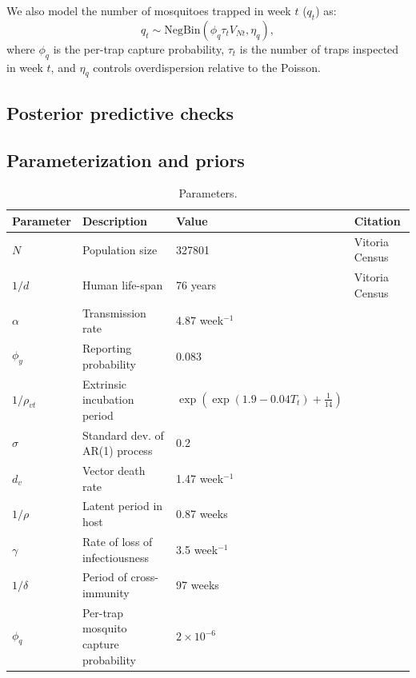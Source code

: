 \documentclass[10pt,letterpaper]{article}
\begin{document}
We also model the number of mosquitoes trapped in week $t$ ($q_t$) as:
\begin{equation}
q_t \sim \text{NegBin}(\phi_q \tau_t V_{Nt}, \eta_q),
\end{equation}
where $\phi_q$ is the per-trap capture probability, $\tau_t$ is the number of traps inspected in week $t$, and $\eta_q$ controls overdispersion relative to the Poisson.

\subsection*{Posterior predictive checks}


\subsection*{Parameterization and priors}


\begin{table}[!ht]
\begin{adjustwidth}{-2.25in}{0in} 
\begin{center}
\caption{Parameters.}
\begin{tabular}{llll}
Parameter & Description & Value & Citation\\
\hline
$N$ & Population size & 327801 & Vitoria Census\\
$1/d$ & Human life-span & 76 years & Vitoria Census\\
$\alpha$ & Transmission rate & 4.87 week$^{-1}$ & \cite{Scott2000}\\
$\phi_y$ & Reporting probability & 0.083 & \cite{Silva2016}\\
$1/\rho_{vt}$ & Extrinsic incubation period & $\exp \left(\exp(1.9 - 0.04 T_t) + \frac{1}{14}\right)$ & \cite{Chan2012}\\
$\sigma$  & Standard dev. of AR(1) process & 0.2 & \\
\hline
$d_v$ & Vector death rate & 1.47 week$^{-1}$ & \cite{Brady2013} \\
$1/\rho$ & Latent period in host & 0.87 weeks  & \cite{Chan2012}\\
$\gamma$ & Rate of loss of infectiousness & 3.5 week$^{-1}$ & \cite{Nguyet2013}\\
$1/\delta$ & Period of cross-immunity & 97 weeks &  \cite{Reich2013}\\
$\phi_q$ & Per-trap mosquito capture probability & $2 \times 10^{-6}$ & 
\end{tabular}
\end{center}
\label{fixedparms}
\end{adjustwidth}
\end{table}
\end{document}
